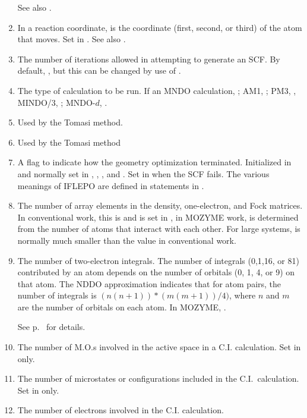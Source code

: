 \begin{enumerate}
See also .
\item {} In a reaction coordinate,  is the coordinate
(first, second, or third) of the atom that moves.  Set in . See
also .
\item {}  The number of iterations allowed in attempting to generate
an SCF.  By default, , but this can be changed by use of
.
\item {} The type of calculation  to be run.
If an MNDO calculation, ; AM1, ; PM3,
, MINDO/3, ; MNDO-$d$, .
\item {} Used by the Tomasi method.
\item {} Used by the Tomasi method
\item {} A flag to indicate how the geometry optimization
terminated.  Initialized in  and normally set in
, , , and .  Set in 
when the SCF fails.  The various meanings of IFLEPO are defined in 
statements in .
\item {} The number of array elements in the density, one-electron,
and Fock matrices.  In conventional work, this is  
and is set in ,
in MOZYME work,  is determined from the number of atoms that
interact with each other.  For large systems,  is normally
much smaller than the value in conventional work.
\item {} The number of two-electron integrals.  The number
of integrals (0,1,16, or 81) contributed by an atom depends on the
number of orbitals (0, 1, 4, or 9) on that atom.  The NDDO
approximation indicates that for atom pairs, the number of integrals is
$(n(n+1))*(m(m+1))/4)$, where $n$ and $m$ are the number of orbitals on
each atom.  In MOZYME, .
\begin{latexonly}
See p.~\pageref{m2el} for details.
\end{latexonly}
\item {} The number of M.O.s involved in the active space in a C.I.
calculation.  Set in  only.
\item {} The number of microstates or configurations included in the
C.I.\ calculation.  Set in  only.
\item {} The number of electrons involved in the C.I. calculation.

\end{enumerate}

